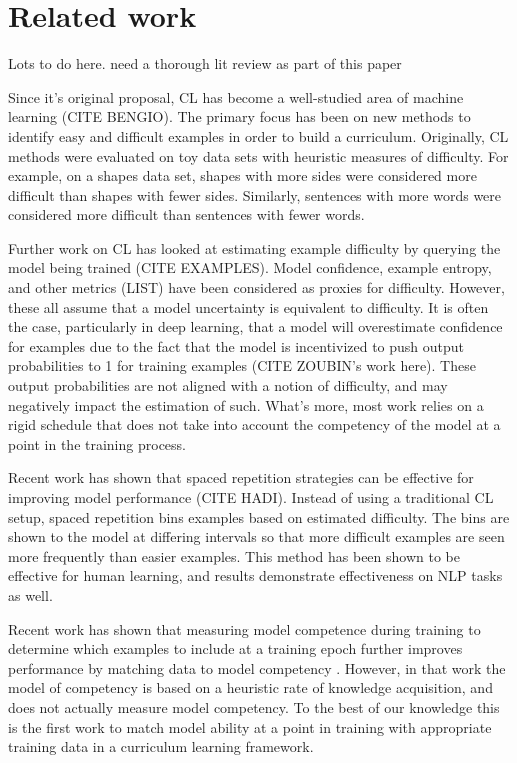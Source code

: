 \documentclass[letterpaper]{article} %
\begin{document}
\section{Related work}

Lots to do here. need a thorough lit review as part of this paper 

Since it's original proposal, CL has become a well-studied area of machine learning (CITE BENGIO).
The primary focus has been on new methods to identify easy and difficult examples in order to build a curriculum. 
Originally, CL methods were evaluated on toy data sets with heuristic measures of difficulty.
For example, on a shapes data set, shapes with more sides were considered more difficult than shapes with fewer sides.
Similarly, sentences with more words were considered more difficult than sentences with fewer words.

Further work on CL has looked at estimating example difficulty by querying the model being trained (CITE EXAMPLES).
Model confidence, example entropy, and other metrics (LIST) have been considered as proxies for difficulty.
However, these all assume that a model uncertainty is equivalent to difficulty.
It is often the case, particularly in deep learning, that a model will overestimate confidence for examples due to the fact that the model is incentivized to push output probabilities to 1 for training examples (CITE ZOUBIN's work here).
These output probabilities are not aligned with a notion of difficulty, and may negatively impact the estimation of such.
What's more, most work relies on a rigid schedule that does not take into account the competency of the model at a point in the training process.

Recent work has shown that spaced repetition strategies can be effective for improving model performance (CITE HADI).
Instead of using a traditional CL setup, spaced repetition bins examples based on estimated difficulty.
The bins are shown to the model at differing intervals so that more difficult examples are seen more frequently than easier examples.
This method has been shown to be effective for human learning, and results demonstrate effectiveness on NLP tasks as well.

Recent work has shown that measuring model competence during training to determine which examples to include at a training epoch further improves performance by matching data to model competency \cite{platanios_competence-based_2019}.
However, in that work the model of competency is based on a heuristic rate of knowledge acquisition, and does not actually measure model competency.
To the best of our knowledge this is the first work to match model ability at a point in training with appropriate training data in a curriculum learning framework.
\end{document}
